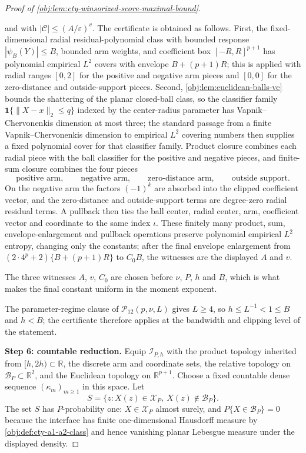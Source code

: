 \documentclass[11pt]{article}
\begin{document}
\begin{proof}[Proof of \cref{obj:lem:cty-winsorized-score-maximal-bound}]
\begin{itemize}
and with \(|\mathcal C|\leq(A/\varepsilon)^v\).  The certificate is obtained as follows.  First, the fixed-dimensional radial residual-polynomial class with bounded response \(|\psi_B(Y)|\leq B\), bounded arm weights, and coefficient box \([-R,R]^{p+1}\) has polynomial empirical \(L^2\) covers with envelope \(B+(p+1)R\); this is applied with radial ranges \([0,2]\) for the positive and negative arm pieces and \([0,0]\) for the zero-distance and outside-support pieces.  Second, \cref{obj:lem:euclidean-balls-vc} bounds the shattering of the planar closed-ball class, so the classifier family \(\mathbf 1\{\lVert X-x\rVert_2\leq q\}\) indexed by the center-radius parameter has Vapnik--Chervonenkis dimension at most three; the standard passage from a finite Vapnik--Chervonenkis dimension to empirical \(L^2\) covering numbers \citep{Pollard1984,VanderVaart1996} then supplies a fixed polynomial cover for that classifier family.  Product closure combines each radial piece with the ball classifier for the positive and negative pieces, and finite-sum closure combines the four pieces
\[
\text{positive arm},\qquad
\text{negative arm},\qquad
\text{zero-distance arm},\qquad
\text{outside support}.
\]
On the negative arm the factors \((-1)^k\) are absorbed into the clipped coefficient vector, and the zero-distance and outside-support terms are degree-zero radial residual terms.  A pullback then ties the ball center, radial center, arm, coefficient vector and coordinate to the same index \(\iota\).  These finitely many product, sum, envelope-enlargement and pullback operations preserve polynomial empirical \(L^2\) entropy, changing only the constants; after the final envelope enlargement from \((2\cdot4^p+2)\{B+(p+1)R\}\) to \(C_0B\), the witnesses are the displayed \(A\) and \(v\).
\end{itemize}
The three witnesses \(A\), \(v\), \(C_0\) are chosen before \(\nu\), \(P\), \(h\) and \(B\), which is what makes the final constant uniform in the moment exponent.

The parameter-regime clause of \(\mathcal P_{12}(p,\nu,L)\) gives \(L\geq4\), so \(h\leq L^{-1}<1\leq B\) and \(h<B\); the certificate therefore applies at the bandwidth and clipping level of the statement.

\textbf{Step 6: countable reduction.}  Equip \(\mathcal I_{P,h}\) with the product topology inherited from \([h,2h)\subset\mathbb R\), the discrete arm and coordinate sets, the relative topology on \(\mathcal B_P\subset\mathbb R^2\), and the Euclidean topology on \(\mathbb R^{p+1}\).  Choose a fixed countable dense sequence \((\kappa_m)_{m\geq1}\) in this space.  Let
\[
S=\{z:X(z)\in\mathcal X_P,\ X(z)\notin\mathcal B_P\}.
\]
The set \(S\) has \(P\)-probability one: \(X\in\mathcal X_P\) almost surely, and \(P\{X\in\mathcal B_P\}=0\) because the interface has finite one-dimensional Hausdorff measure by \cref{obj:def:cty-a1-a2-class} and hence vanishing planar Lebesgue measure under the displayed density.


\end{proof}
\end{document}
